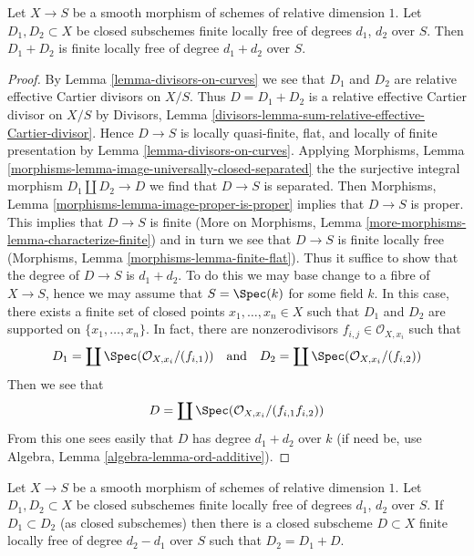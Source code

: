 \begin{lemma}
\label{lemma-sum-divisors-on-curves}
Let $X \to S$ be a smooth morphism of schemes of relative dimension $1$.
Let $D_1, D_2 \subset X$ be closed subschemes finite locally free of
degrees $d_1$, $d_2$ over $S$. Then $D_1 + D_2$ is finite locally free
of degree $d_1 + d_2$ over $S$.
\end{lemma}

\begin{proof}
By Lemma \ref{lemma-divisors-on-curves} we see that $D_1$
and $D_2$ are relative effective Cartier divisors on $X/S$.
Thus $D = D_1 + D_2$ is a relative effective Cartier divisor
on $X/S$ by
Divisors, Lemma \ref{divisors-lemma-sum-relative-effective-Cartier-divisor}.
Hence $D \to S$ is locally quasi-finite, flat, and
locally of finite presentation by
Lemma \ref{lemma-divisors-on-curves}.
Applying
Morphisms, Lemma \ref{morphisms-lemma-image-universally-closed-separated}
the the surjective integral morphism $D_1 \amalg D_2 \to D$
we find that $D \to S$ is separated. Then
Morphisms, Lemma \ref{morphisms-lemma-image-proper-is-proper}
implies that $D \to S$ is proper.
This implies that $D \to S$ is finite
(More on Morphisms, Lemma \ref{more-morphisms-lemma-characterize-finite})
and in turn we see that $D \to S$ is finite locally free
(Morphisms, Lemma \ref{morphisms-lemma-finite-flat}).
Thus it suffice to show that the degree of $D \to S$ is $d_1 + d_2$.
To do this we may base change to a fibre of $X \to S$, hence we may
assume that $S = \Spec(k)$ for some field $k$.
In this case, there exists a finite set of closed points
$x_1, \ldots, x_n \in X$ such that $D_1$ and $D_2$
are supported on $\{x_1, \ldots, x_n\}$.
In fact, there are nonzerodivisors $f_{i, j} \in \mathcal{O}_{X, x_i}$
such that
$$
D_1 = \coprod \Spec(\mathcal{O}_{X, x_i}/(f_{i, 1}))
\quad\text{and}\quad
D_2 = \coprod \Spec(\mathcal{O}_{X, x_i}/(f_{i, 2}))
$$
Then we see that
$$
D = \coprod \Spec(\mathcal{O}_{X, x_i}/(f_{i, 1}f_{i, 2}))
$$
From this one sees easily that $D$ has degree $d_1 + d_2$
over $k$ (if need be, use Algebra, Lemma \ref{algebra-lemma-ord-additive}).
\end{proof}

\begin{lemma}
\label{lemma-difference-divisors-on-curves}
Let $X \to S$ be a smooth morphism of schemes of relative dimension $1$.
Let $D_1, D_2 \subset X$ be closed subschemes finite locally free of
degrees $d_1$, $d_2$ over $S$. If $D_1 \subset D_2$ (as closed subschemes)
then there is a closed subscheme $D \subset X$ finite locally free of
degree $d_2 - d_1$ over $S$ such that $D_2 = D_1 + D$.
\end{lemma}


